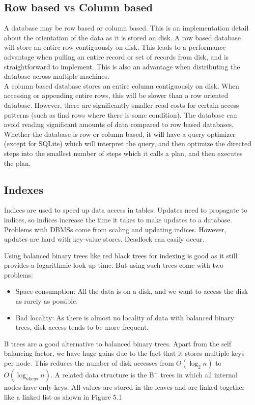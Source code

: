 \documentclass[twoside]{article}
\begin{document}
\subsection{Row based vs Column based}
A database may be row based or column based. This is an implementation detail about the orientation of the data as it is stored on disk. A row based database will store an entire row contiguously on disk. This leads to a performance advantage when pulling an entire record or set of records from disk, and is straightforward to implement. This is also an advantage when distributing the database across multiple machines.\\
A column based database stores an entire column contiguously on disk. When accessing or appending entire rows, this will be slower than a row oriented database. However, there are significantly smaller read costs for certain access patterns (such as find rows where there is some condition). The database can avoid reading significant amounts of data compared to row based databases.\\ Whether the database is row or column based, it will have a query optimizer (except for SQLite) which will interpret the query, and then optimize the directed steps into the smallest number of steps which it calls a plan, and then executes the plan. 

\subsection{Indexes}
Indices are used to speed up data access in tables. Updates need to propagate to indices, so indices increase the time it takes to make updates to a database. Problems with DBMSs come from scaling and updating indices. However, updates are hard with key-value stores. Deadlock can easily occur. 

Using balanced binary trees like red black trees for indexing is good as it still provides a logarithmic look up time. But using such trees come with two problems:
\begin{itemize}
    \itemsep0em
    \item Space consumption: All the data is on a disk, and we want to access the disk as rarely as possible.
    \item Bad locality: As there is almost no locality of data with balanced binary trees, disk access tends to be more frequent.
\end{itemize}
B trees are a good alternative to balanced binary trees. Apart from the self balancing factor, we have huge gains due to the fact that it stores multiple keys per node. This reduces the number of disk accesses from $O(\log_2n)$ to $O(\log_{nkeys}n)$. A related data structure is the B$^+$ trees in which all internal nodes have only keys. All values are stored in the leaves and are linked together like a linked list as shown in Figure 5.1
\end{document}
